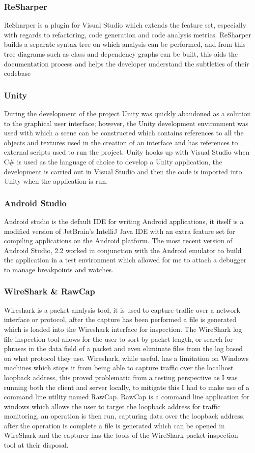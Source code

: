 \documentclass{article}
\begin{document}
\subsubsection{ReSharper}
ReSharper is a plugin for Visual Studio which extends the feature set, especially with regards to refactoring, code generation and code analysis metrics. ReSharper builds a separate syntax tree on which analysis can be performed, and from this tree diagrams such as class and dependency graphs can be built, this aids the documentation process and helps the developer understand the subtleties of their codebase
\subsubsection{Unity}
During the development of the project Unity was quickly abandoned as a solution to the graphical user interface; however, the Unity development environment was used with which a scene can be constructed which contains references to all the objects and textures used in the creation of an interface and has references to external scripts used to run the project. Unity hooks up with Visual Studio when C\# is used as the language of choice to develop a Unity application, the development is carried out in Visual Studio and then the code is imported into Unity when the application is run.
\subsubsection{Android Studio}
Android studio is the default IDE for writing Android applications, it itself is a modified version of JetBrain’s IntelliJ Java IDE with an extra feature set for compiling applications on the Android platform. The most recent version of Android Studio, 2.2 worked in conjunction with the Android emulator to build the application in a test environment which allowed for me to attach a debugger to manage breakpoints and watches.
\subsubsection{WireShark \& RawCap}
Wireshark is a packet analysis tool, it is used to capture traffic over a network interface or protocol, after the capture has been performed a file is generated which is loaded into the Wireshark interface for inspection. The WireShark log file inspection tool allows for the user to sort by packet length, or search for phrases in the data field of a packet and even eliminate files from the log based on what protocol they use. Wireshark, while useful, has a limitation on Windows machines which stops it from being able to capture traffic over the localhost loopback address, this proved problematic from a testing perspective as I was running both the client and server locally, to mitigate this I had to make use of a command line utility named RawCap. RawCap is a command line application for windows which allows the user to target the loopback address for traffic monitoring, an operation is then run, capturing data over the loopback address, after the operation is complete a file is generated which can be opened in WireShark and the capturer has the tools of the WireShark packet inspection tool at their disposal.
\end{document}
